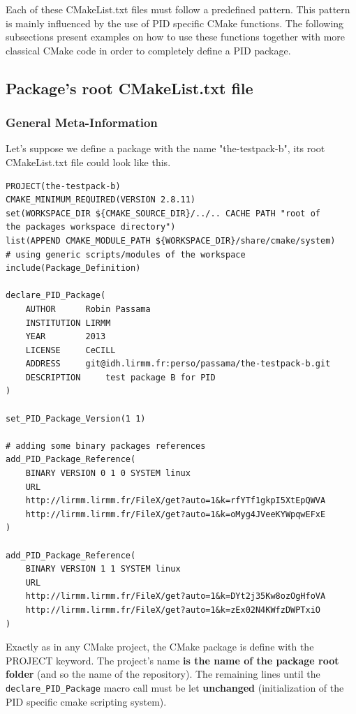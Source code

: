 \documentclass[12pt,a4paper]{article}
\begin{document}
Each of these CMakeList.txt files must follow a predefined pattern. This pattern is mainly influenced by the use of PID specific CMake functions. The following subsections present examples on how to use these functions together with more classical CMake code in order to completely define a PID package.

\subsection{Package's root CMakeList.txt file}
\label{sec:rootCMake}

\subsubsection{General Meta-Information}
\label{sec:rootCMakeGeneral}

Let's suppose we define a package with the name "the-testpack-b", its root CMakeList.txt file could look like this.

\begin{verbatim}
PROJECT(the-testpack-b)
CMAKE_MINIMUM_REQUIRED(VERSION 2.8.11)
set(WORKSPACE_DIR ${CMAKE_SOURCE_DIR}/../.. CACHE PATH "root of 
the packages workspace directory")
list(APPEND CMAKE_MODULE_PATH ${WORKSPACE_DIR}/share/cmake/system) 
# using generic scripts/modules of the workspace
include(Package_Definition)

declare_PID_Package(	
    AUTHOR      Robin Passama 
    INSTITUTION LIRMM 
    YEAR        2013 
    LICENSE     CeCILL
    ADDRESS     git@idh.lirmm.fr:perso/passama/the-testpack-b.git
    DESCRIPTION 	test package B for PID
)

set_PID_Package_Version(1 1)

# adding some binary packages references
add_PID_Package_Reference(
    BINARY VERSION 0 1 0 SYSTEM linux 
    URL 	
    http://lirmm.lirmm.fr/FileX/get?auto=1&k=rfYTf1gkpI5XtEpQWVA		
    http://lirmm.lirmm.fr/FileX/get?auto=1&k=oMyg4JVeeKYWpqwEFxE
)

add_PID_Package_Reference(	
    BINARY VERSION 1 1 SYSTEM linux 
    URL 
    http://lirmm.lirmm.fr/FileX/get?auto=1&k=DYt2j35Kw8ozOgHfoVA
    http://lirmm.lirmm.fr/FileX/get?auto=1&k=zEx02N4KWfzDWPTxiO
)
\end{verbatim}

Exactly as in any CMake project, the CMake package is define with the PROJECT keyword. The project's name \textbf{is the name of the package root folder} (and so the name of the repository). The remaining lines until the \texttt{declare\_PID\_Package} macro call must be let \textbf{unchanged} (initialization of the PID specific cmake scripting system).
\end{document}
